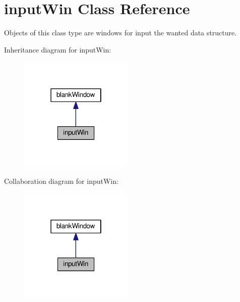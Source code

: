 \hypertarget{classgui_1_1window2_1_1inputWin}{\section{input\-Win Class Reference}
\label{classgui_1_1window2_1_1inputWin}
}


Objects of this class type are windows for input the wanted data structure.  




Inheritance diagram for input\-Win\-:\nopagebreak
\begin{figure}[H]
\begin{center}
\leavevmode
\includegraphics[width=154pt]{classgui_1_1window2_1_1inputWin__inherit__graph}
\end{center}
\end{figure}


Collaboration diagram for input\-Win\-:\nopagebreak
\begin{figure}[H]
\begin{center}
\leavevmode
\includegraphics[width=154pt]{classgui_1_1window2_1_1inputWin__coll__graph}
\end{center}
\end{figure}
